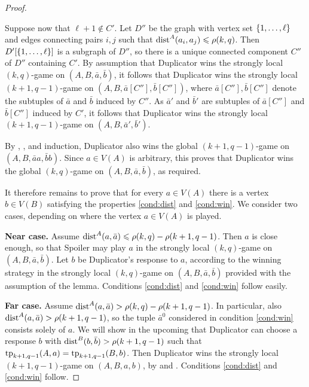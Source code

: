 \begin{proof}
\begin{claimproof}
Suppose now that $\ell+1\notin C'$.
Let  $D''$ be the graph with vertex set $\{1,\ldots,\ell\}$ and edges connecting pairs $i,j$ such that $\mathrm{dist}^A(a_i,a_j)\leqslant \rho(k,q)$.
Then $D'[\{1,\ldots,\ell\}]$ is a subgraph of $D''$, so there is a unique connected component $C''$ of $D''$ containing $C'$. 
By assumption that Duplicator wins the strongly local $(k,q)$-game on $(A,B,\bar a,\bar b)$, it follows that  Duplicator wins the strongly local $(k+1,q-1)$-game on $(A,B,\bar a[C''],\bar b[C''])$, where $\bar a[C''],\bar b[C'']$ denote the subtuples of $\bar a$ and $\bar b$ induced by $C''$.
As $\bar a'$ and $\bar b'$ are subtuples of $\bar a[C'']$ and $\bar b[C'']$ induced by $C'$,
it follows that Duplicator wins the strongly local $(k+1,q-1)$-game on $(A,B,\bar a',\bar b')$.
\end{claimproof}


By , , and induction, Duplicator  also wins the global \((k+1,q-1)\)-game on \((A,B,\bar a a,\bar b b)\).
    Since $a\in V(A)$ is arbitrary, this proves that Duplicator wins the global $(k,q)$-game on $(A,B,\bar a,\bar b)$, as required.

    \medskip

It therefore remains to prove that for every $a\in V(A)$ there is a vertex $b\in V(B)$ satisfying the properties \ref{cond:dist} and \ref{cond:win}.
We consider two cases, depending on where the vertex $a\in V(A)$ is played.

    \textbf{Near case.} Assume \(\mathrm{dist}^A(a,\bar a) \leqslant \rho(k,q)-\rho(k+1,q-1)\).
    Then \(a\) is close enough, so that Spoiler may play \(a\) in the strongly local \((k,q)\)-game on \((A,B,\bar a,\bar b)\).
    Let $b$ be Duplicator's response to $a$, according to the winning strategy in the strongly local $(k,q)$-game on $(A,B,\bar a,\bar b)$ provided with the assumption of the lemma. Conditions \ref{cond:dist} and \ref{cond:win} follow easily.

    \textbf{Far case.} Assume \(\mathrm{dist}^A(a,\bar a) > \rho(k,q)-\rho(k+1,q-1)\).
    In particular, also $\mathrm{dist}^A(a,\bar a)>\rho(k+1,q-1)$, so the tuple \(\bar a^0\) considered in condition \ref{cond:win} consists solely of $a$.
    We will show in the upcoming  that Duplicator can choose a response \(b\)
    with \(\mathrm{dist}^B(b,\bar b) > \rho(k+1,q-1)\) such that 
    $\textnormal{tp}_{k+1,q-1}(A,a)=
\textnormal{tp}_{k+1,q-1}(B,b)$. 
Then Duplicator wins the strongly local \((k+1,q-1)\)-game on \((A,B,a,b)\), 
by  and . Conditions \ref{cond:dist} and \ref{cond:win}
    follow.


\end{proof}
